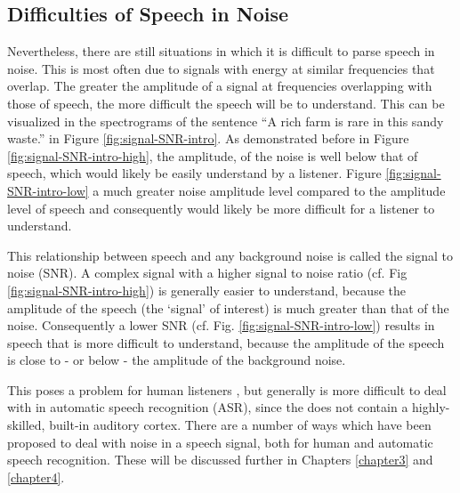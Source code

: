 \subsection{Difficulties of Speech in Noise}\label{sec:snr-difficult}

Nevertheless, there are still situations in which it is difficult to parse speech in noise.  This is most often due to signals with energy at similar frequencies that overlap.  The greater the amplitude of a signal at frequencies overlapping with those of speech, the more difficult the speech will be to understand.  This can be visualized in the spectrograms of the sentence ``A rich farm is rare in this sandy waste.'' in Figure \ref{fig:signal-SNR-intro}.  As demonstrated before in Figure \ref{fig:signal-SNR-intro-high}, the amplitude, \DIFdelbegin {}\DIFdelend of the noise is well below that of speech, which would likely be easily understand by a listener.  Figure \ref{fig:signal-SNR-intro-low} \DIFdelbegin {}\DIFdelend \DIFaddbegin {}\DIFaddend a much greater noise amplitude level compared to the amplitude level of speech and consequently would likely be more difficult for a listener to understand.

This relationship between speech and any background noise is called the signal to noise \DIFdelbegin {}\DIFdelend \DIFaddbegin {}\DIFaddend (SNR).  A complex signal with a higher signal to noise ratio (cf. Fig \ref{fig:signal-SNR-intro-high}) is generally easier to understand, because the amplitude of the speech (the `signal' of interest) is much greater than that of the noise.  Consequently a lower SNR (cf. Fig. \ref{fig:signal-SNR-intro-low}) results in speech that is more difficult to understand, because the amplitude of the speech is close to - or below - the amplitude of the background noise\DIFaddbegin {}\DIFaddend .

This poses a problem for human listeners \DIFaddbegin {}\DIFaddend , but generally is more difficult to deal with in automatic speech recognition (ASR), since the \DIFdelbegin {}\DIFdelend \DIFaddbegin {}\DIFaddend does not contain a highly-skilled, built-in auditory cortex.  There are a number of ways which have been proposed to deal with noise in a speech signal, both for human and automatic speech recognition.  These will be discussed further in Chapters \ref{chapter3} and \ref{chapter4}.

